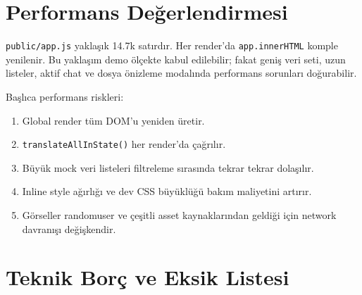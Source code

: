 \documentclass[11pt,a4paper]{article}
\newcommand{\code}[1]{\texttt{#1}}
\begin{document}
\section{Performans Değerlendirmesi}

\code{public/app.js} yaklaşık 14.7k satırdır. Her render'da \code{app.innerHTML} komple yenilenir. Bu yaklaşım demo ölçekte kabul edilebilir; fakat geniş veri seti, uzun listeler, aktif chat ve dosya önizleme modalında performans sorunları doğurabilir.

Başlıca performans riskleri:

\begin{enumerate}
  \item Global render tüm DOM'u yeniden üretir.
  \item \code{translateAllInState()} her render'da çağrılır.
  \item Büyük mock veri listeleri filtreleme sırasında tekrar tekrar dolaşılır.
  \item Inline style ağırlığı ve dev CSS büyüklüğü bakım maliyetini artırır.
  \item Görseller randomuser ve çeşitli asset kaynaklarından geldiği için network davranışı değişkendir.
\end{enumerate}

\section{Teknik Borç ve Eksik Listesi}
\end{document}
